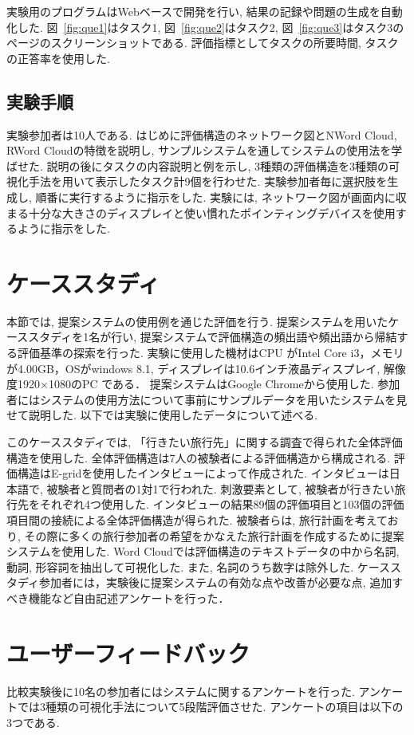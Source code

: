 \documentclass[syuuron]{kuee}
\begin{document}
			実験用のプログラムはWebベースで開発を行い, 結果の記録や問題の生成を自動化した. 
			図~\ref{fig:que1}はタスク1, 図~\ref{fig:que2}はタスク2, 
			図~\ref{fig:que3}はタスク3のページのスクリーンショットである. 
			評価指標としてタスクの所要時間, タスクの正答率を使用した. 
		
		\subsection{実験手順}
			実験参加者は10人である. 
			はじめに評価構造のネットワーク図とNWord Cloud, RWord Cloudの特徴を説明し, 
			サンプルシステムを通してシステムの使用法を学ばせた. 
			説明の後にタスクの内容説明と例を示し, 3種類の評価構造を3種類の可視化手法を用いて表示したタスク計9個を行わせた. 
			実験参加者毎に選択肢を生成し, 順番に実行するように指示をした. 
			実験には, ネットワーク図が画面内に収まる十分な大きさのディスプレイと使い慣れたポインティングデバイスを使用するように指示をした. 
		
	\section{ケーススタディ}
		本節では, 提案システムの使用例を通じた評価を行う. 
		提案システムを用いたケーススタディを1名が行い, 提案システムで評価構造の頻出語や頻出語から帰結する評価基準の探索を行った. 
		実験に使用した機材はCPU がIntel Core i3，メモリが4.00GB，OSがwindows 8.1, ディスプレイは10.6インチ液晶ディスプレイ, 解像度1920×1080のPC である．
		提案システムはGoogle Chromeから使用した. 
		参加者にはシステムの使用方法について事前にサンプルデータを用いたシステムを見せて説明した. 以下では実験に使用したデータについて述べる. 
		
		このケーススタディでは, 「行きたい旅行先」に関する調査で得られた全体評価構造を使用した. 
		全体評価構造は7人の被験者による評価構造から構成される. 
		評価構造はE-gridを使用したインタビューによって作成された. 
		インタビューは日本語で, 被験者と質問者の1対1で行われた. 
		刺激要素として, 被験者が行きたい旅行先をそれぞれ4つ使用した. 
		インタビューの結果89個の評価項目と103個の評価項目間の接続による全体評価構造が得られた. 
		被験者らは, 旅行計画を考えており, その際に多くの旅行参加者の希望をかなえた旅行計画を作成するために提案システムを使用した. 
		Word Cloudでは評価構造のテキストデータの中から名詞, 動詞, 形容詞を抽出して可視化した. 
		また, 名詞のうち数字は除外した. 
		ケーススタディ参加者には，実験後に提案システムの有効な点や改善が必要な点, 追加すべき機能など自由記述アンケートを行った．
		
	\section{ユーザーフィードバック}
		比較実験後に10名の参加者にはシステムに関するアンケートを行った. 
		アンケートでは3種類の可視化手法について5段階評価させた. 
		アンケートの項目は以下の3つである. 
		
\end{document}
